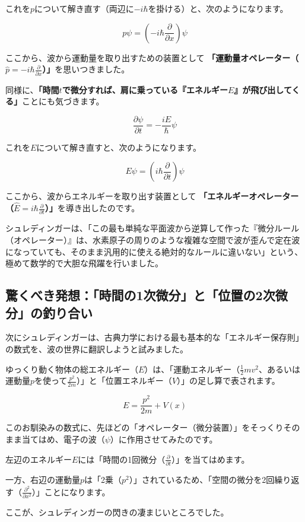 これを\(p\)について解き直す（両辺に\(-i\hbar\)を掛ける）と、次のようになります。

\[p \psi = \left( -i\hbar \frac{\partial}{\partial x} \right) \psi\]

ここから、波から運動量を取り出すための装置として \textbf{「運動量オペレーター（\(\hat{p} = -i\hbar \frac{\partial}{\partial x}\)）」}を思いつきました。

同様に、\textbf{「時間\(t\)で微分すれば、肩に乗っている『エネルギー\(E\)』が飛び出してくる」}ことにも気づきます。

\[\frac{\partial \psi}{\partial t} = -\frac{iE}{\hbar} \psi\]

これを\(E\)について解き直すと、次のようになります。

\[E \psi = \left( i\hbar \frac{\partial}{\partial t} \right) \psi\]

ここから、波からエネルギーを取り出す装置として \textbf{「エネルギーオペレーター（\(\hat{E} = i\hbar \frac{\partial}{\partial t}\)）」}を導き出したのです。

シュレディンガーは、「この最も単純な平面波から逆算して作った『微分ルール（オペレーター）』は、水素原子の周りのような複雑な空間で波が歪んで定在波になっていても、そのまま汎用的に使える絶対的なルールに違いない」という、極めて数学的で大胆な飛躍を行いました。

\subsection{驚くべき発想：「時間の1次微分」と「位置の2次微分」の釣り合い}

次にシュレディンガーは、古典力学における最も基本的な「エネルギー保存則」の数式を、波の世界に翻訳しようと試みました。

ゆっくり動く物体の総エネルギー（\(E\)）は、「運動エネルギー（\(\frac{1}{2}mv^2\)、あるいは運動量\(p\)を使って\(\frac{p^2}{2m}\)）」と「位置エネルギー（\(V\)）」の足し算で表されます。

\[E = \frac{p^2}{2m} + V(x)\]

このお馴染みの数式に、先ほどの「オペレーター（微分装置）」をそっくりそのまま当てはめ、電子の波（\(\psi\)）に作用させてみたのです。

左辺のエネルギー\(E\)には「時間の1回微分（\(\frac{\partial}{\partial t}\)）」を当てはめます。

一方、右辺の運動量\(p\)は「2乗（\(p^2\)）」されているため、「空間の微分を2回繰り返す（\(\frac{\partial^2}{\partial x^2}\)）」ことになります。

ここが、シュレディンガーの閃きの凄まじいところでした。

